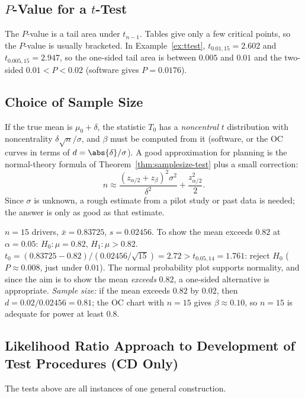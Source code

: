 \subsection{$P$-Value for a $t$-Test}

The $P$-value is a tail area under $t_{n-1}$. Tables give only a few critical points, so the $P$-value is usually bracketed. In Example~\ref{ex:ttest}, $t_{0.01,15}=2.602$ and $t_{0.005,15}=2.947$, so the one-sided tail area is between $0.005$ and $0.01$ and the two-sided $0.01<P<0.02$ (software gives $P=0.0176$).

\subsection{Choice of Sample Size}

If the true mean is $\mu_0+\delta$, the statistic $T_0$ has a \emph{noncentral} $t$ distribution with noncentrality $\delta\sqrt n/\sigma$, and $\beta$ must be computed from it (software, or the OC curves in terms of $d=\abs{\delta}/\sigma$). A good approximation for planning is the normal-theory formula of Theorem~\ref{thm:samplesize-test} plus a small correction:
\[ n\approx\frac{(z_{\alpha/2}+z_\beta)^2\sigma^2}{\delta^2}+\frac{z_{\alpha/2}^2}2. \]
Since $\sigma$ is unknown, a rough estimate from a pilot study or past data is needed; the answer is only as good as that estimate.

\begin{example}
$n=15$ drivers, $\bar{x}=0.83725$, $s=0.02456$. To show the mean exceeds $0.82$ at $\alpha=0.05$: $H_0:\mu=0.82$, $H_1:\mu>0.82$. $t_0=(0.83725-0.82)/(0.02456/\sqrt{15})=2.72>t_{0.05,14}=1.761$: reject $H_0$ ($P\approx0.008$, just under $0.01$). The normal probability plot supports normality, and since the aim is to show the mean \emph{exceeds} $0.82$, a one-sided alternative is appropriate. \emph{Sample size:} if the mean exceeds $0.82$ by $0.02$, then $d=0.02/0.02456=0.81$; the OC chart with $n=15$ gives $\beta\approx0.10$, so $n=15$ is adequate for power at least $0.8$.
\end{example}

\subsection{Likelihood Ratio Approach to Development of Test Procedures (CD Only)}

The tests above are all instances of one general construction.

